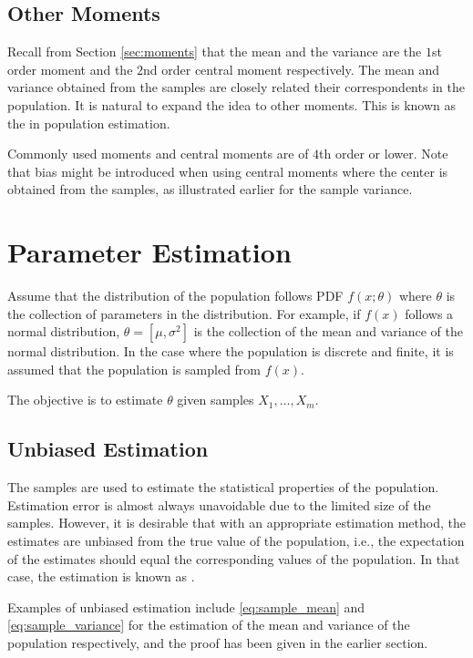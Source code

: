 \subsection{Other Moments}

Recall from Section \ref{sec:moments} that the mean and the variance are the $1$st order moment and the $2$nd order central moment respectively. The mean and variance obtained from the samples are closely related their correspondents in the population. It is natural to expand the idea to other moments. This is known as the  in population estimation.

Commonly used moments and central moments are of $4$th order or lower. Note that bias might be introduced when using central moments where the center is obtained from the samples, as illustrated earlier for the sample variance.

\section{Parameter Estimation} \label{sec:mlemap}

Assume that the distribution of the population follows PDF $f(x;\theta)$ where $\theta$ is the collection of parameters in the distribution. For example, if $f(x)$ follows a normal distribution, $\theta=[\mu, \sigma^2]$ is the collection of the mean and variance of the normal distribution. In the case where the population is discrete and finite, it is assumed that the population is sampled from $f(x)$.

The objective is to estimate $\theta$ given samples $X_1, \ldots, X_m$.

\subsection{Unbiased Estimation}

The samples are used to estimate the statistical properties of the population. Estimation error is almost always unavoidable due to the limited size of the samples. However, it is desirable that with an appropriate estimation method, the estimates are unbiased from the true value of the population, i.e., the expectation of the estimates should equal the corresponding values of the population. In that case, the estimation is known as . 

Examples of unbiased estimation include \eqref{eq:sample_mean} and \eqref{eq:sample_variance} for the estimation of the mean and variance of the population respectively, and the proof has been given in the earlier section.

